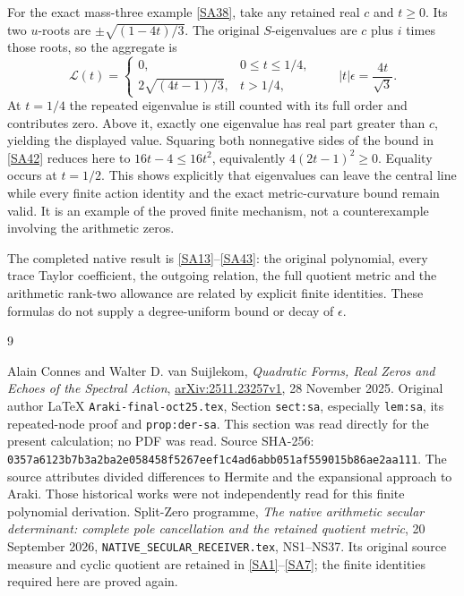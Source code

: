 \documentclass[11pt]{article}
\begin{document}
For the exact mass-three example \eqref{SA38}, take
any retained real $c$ and $t\geq0$. Its two $u$-roots
are $\pm\sqrt{(1-4t)/3}$. The original $S$-eigenvalues
are $c$ plus $i$ times those roots, so the aggregate is
\begin{equation}\tag{SA43}\label{SA43}
\mathcal L(t)=
\begin{cases}
0,&0\leq t\leq1/4,\\
2\sqrt{(4t-1)/3},&t>1/4,
\end{cases}
\qquad |t|\epsilon=\frac{4t}{\sqrt3}.
\end{equation}
At $t=1/4$ the repeated eigenvalue is still counted with
its full order and contributes zero. Above it, exactly
one eigenvalue has real part greater than $c$, yielding
the displayed value. Squaring both nonnegative sides
of the bound in \eqref{SA42} reduces here to
$16t-4\leq16t^2$, equivalently
$4(2t-1)^2\geq0$. Equality occurs at $t=1/2$.
This shows explicitly that eigenvalues can leave the
central line while every finite action identity and
the exact metric-curvature bound remain valid.
It is an example of the proved finite mechanism,
not a counterexample involving the arithmetic zeros.

The completed native result is \eqref{SA13}--\eqref{SA43}:
the original polynomial, every trace Taylor coefficient,
the outgoing relation, the full quotient metric and
the arithmetic rank-two allowance are related by
explicit finite identities. These formulas do not
supply a degree-uniform bound or decay of $\epsilon$.

\begin{thebibliography}{9}\raggedright
{} Alain Connes and Walter D. van Suijlekom,
\emph{Quadratic Forms, Real Zeros and Echoes of the Spectral Action},
\href{https://arxiv.org/abs/2511.23257v1}{arXiv:2511.23257v1},
28 November 2025. Original author LaTeX
\texttt{Araki-final-oct25.tex}, Section \texttt{sect:sa},
especially \texttt{lem:sa}, its repeated-node proof and
\texttt{prop:der-sa}. This section was read directly for
the present calculation; no PDF was read. Source SHA-256:
\texttt{0357a6123b7b3a2ba2e058458f5267eef1c4ad6abb051af559015b86ae2aa111}.
The source attributes divided differences to Hermite
and the expansional approach to Araki. Those historical
works were not independently read for this finite
polynomial derivation.
 Split-Zero programme,
\emph{The native arithmetic secular determinant:
complete pole cancellation and the retained quotient metric},
20 September 2026, \texttt{NATIVE\_SECULAR\_RECEIVER.tex},
NS1--NS37. Its original source measure and cyclic
quotient are retained in \eqref{SA1}--\eqref{SA7};
the finite identities required here are proved again.
\end{thebibliography}
\end{document}
